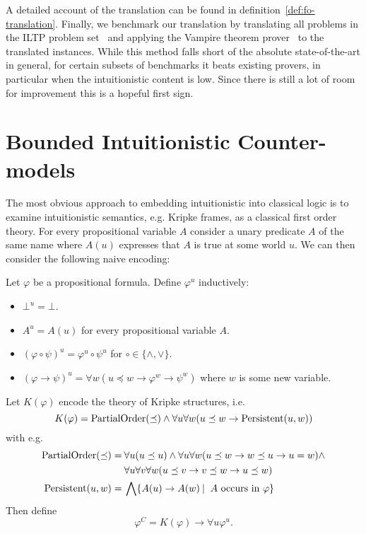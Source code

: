 \documentclass[runningheads]{llncs}
\begin{document}
A detailed account of the translation can be found in definition~\ref{def:fo-translation}. Finally, we benchmark our translation by translating all problems in the ILTP problem set~\cite{iltp} and applying the Vampire theorem prover~\cite{kovacs2013first} to the translated instances. While this method falls short of the absolute state-of-the-art in general, for certain subsets of benchmarks it beats existing provers, in particular when the intuitionistic content is low. Since there is still a lot of room for improvement this is a hopeful first sign.


\section{Bounded Intuitionistic Counter-models}

The most obvious approach to embedding intuitionistic into classical logic is to examine intuitionistic semantics, e.g. Kripke frames, as a classical first order theory. For every propositional variable $A$ consider a unary predicate $A$ of the same name where $A(u)$ expresses that $A$ is true at some world $u$. We can then consider the following naive encoding:

\begin{definition}
	Let $\varphi$ be a propositional formula. Define $\varphi^{u}$ inductively:
	\begin{itemize}
		\item $\bot^u = \bot$.
		\item $A^{u} = A(u)$ for every propositional variable $A$.
		\item $(\varphi\circ\psi)^u = \varphi^u\circ\psi^u$ for $\circ\in\{\wedge, \vee\}$.
		\item $(\varphi\to \psi)^u = \forall w(u\preceq w\to\varphi^{w}\to\psi^{w})$ where $w$ is some new variable.
	\end{itemize}
	Let $K(\varphi)$ encode the theory of Kripke structures, i.e.
	$$K(\varphi) = \text{\normalfont PartialOrder}(\preceq)\wedge\forall u\forall w(u\preceq w\to \text{\normalfont Persistent}(u, w))$$
	with e.g.
	\begin{align*}
		\text{\normalfont PartialOrder}(\preceq) =&\:\forall u(u\preceq u)\wedge\forall u\forall w(u\preceq w\to w\preceq u\to u = w)\wedge\\&\:\forall u\forall v\forall w(u\preceq v\to v\preceq w\to u\preceq w)\\
		\text{\normalfont Persistent}(u, w)=&\:\bigwedge \{A(u)\to A(w)\:|\: \text{ $A$ occurs in $\varphi$}\}
	\end{align*}
	Then define
	$$\varphi^{C} = K(\varphi)\to \forall u\varphi^{u}.$$
\end{definition}
\end{document}
